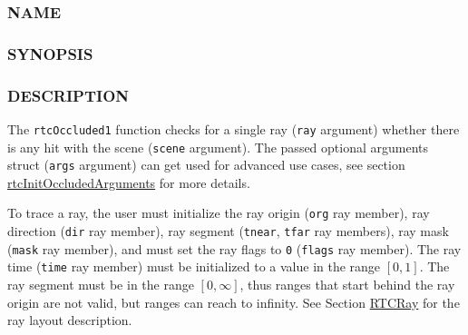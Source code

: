\subsubsection{NAME}\label{name}

\begin{Shaded}
\begin{Highlighting}[]
\OperatorTok{{-}}
\end{Highlighting}
\end{Shaded}

\subsubsection{SYNOPSIS}\label{synopsis}

\begin{Shaded}
\begin{Highlighting}[]

\OperatorTok{(}
\OperatorTok{,}
  \OperatorTok{*}\OperatorTok{,}
  \OperatorTok{*}\OperatorTok{=}
\OperatorTok{);}
\end{Highlighting}
\end{Shaded}

\subsubsection{DESCRIPTION}\label{description}

The \texttt{rtcOccluded1} function checks for a single ray (\texttt{ray}
argument) whether there is any hit with the scene (\texttt{scene}
argument). The passed optional arguments struct (\texttt{args} argument)
can get used for advanced use cases, see section
\hyperref[rtcinitoccludedarguments]{rtcInitOccludedArguments} for more
details.

To trace a ray, the user must initialize the ray origin (\texttt{org}
ray member), ray direction (\texttt{dir} ray member), ray segment
(\texttt{tnear}, \texttt{tfar} ray members), ray mask (\texttt{mask} ray
member), and must set the ray flags to \texttt{0} (\texttt{flags} ray
member). The ray time (\texttt{time} ray member) must be initialized to
a value in the range \([0, 1]\). The ray segment must be in the range
\([0, \infty]\), thus ranges that start behind the ray origin are not
valid, but ranges can reach to infinity. See Section
\hyperref[rtcray]{RTCRay} for the ray layout description.

